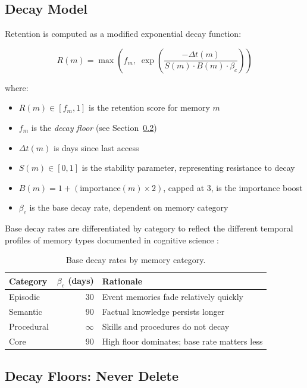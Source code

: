 \documentclass[11pt,a4paper]{article}
\begin{document}
\subsection{Decay Model}
\label{sec:decay}

Retention is computed as a modified exponential decay function:

\begin{equation}
R(m) = \max\left(f_m,\; \exp\!\left(\frac{-\Delta t(m)}{S(m) \cdot B(m) \cdot \beta_c}\right)\right)
\label{eq:retention}
\end{equation}

\noindent where:
\begin{itemize}
    \item $R(m) \in [f_m, 1]$ is the retention score for memory $m$
    \item $f_m$ is the \emph{decay floor} (see Section~\ref{sec:floors})
    \item $\Delta t(m)$ is days since last access
    \item $S(m) \in [0, 1]$ is the stability parameter, representing resistance to decay
    \item $B(m) = 1 + (\text{importance}(m) \times 2)$, capped at 3, is the importance boost
    \item $\beta_c$ is the base decay rate, dependent on memory category
\end{itemize}

Base decay rates are differentiated by category to reflect the different temporal profiles of memory types documented in cognitive science \citep{finley2025expanded}:

\begin{table}[h]
\centering
\small
\begin{tabular}{@{}lrl@{}}
\toprule
\textbf{Category} & \textbf{$\beta_c$ (days)} & \textbf{Rationale} \\
\midrule
Episodic & 30 & Event memories fade relatively quickly \\
Semantic & 90 & Factual knowledge persists longer \\
Procedural & $\infty$ & Skills and procedures do not decay \\
Core & 90 & High floor dominates; base rate matters less \\
\bottomrule
\end{tabular}
\caption{Base decay rates by memory category.}
\label{tab:decay}
\end{table}

\subsection{Decay Floors: Never Delete}
\label{sec:floors}
\end{document}
